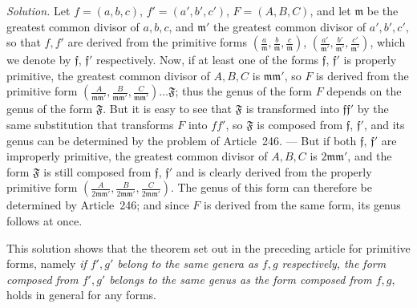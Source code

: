 \textit{Solution.} Let $f=(a,b,c)$, $f'=(a',b',c')$, $F=(A,B,C)$, and let $\mathfrak{m}$ be the greatest common divisor of $a,b,c$, and $\mathfrak{m}'$ the greatest common divisor of $a',b',c'$, so that $f,f'$ are derived from the primitive forms $(\frac{a}{\mathfrak{m}},\allowbreak \frac{b}{\mathfrak{m}},\allowbreak \frac{c}{\mathfrak{m}})$, $(\frac{a'}{\mathfrak{m}'},\allowbreak \frac{b'}{\mathfrak{m}'},\allowbreak \frac{c'}{\mathfrak{m}'})$, which we denote by $\mathfrak{f}$, $\mathfrak{f}'$ respectively. Now, if at least one of the forms $\mathfrak{f}$, $\mathfrak{f}'$ is properly primitive, the greatest common divisor of $A,B,C$ is $\mathfrak{m}\mathfrak{m}'$, so $F$ is derived from the primitive form $(\frac{A}{\mathfrak{m}\mathfrak{m}'},\allowbreak \frac{B}{\mathfrak{m}\mathfrak{m}'},\allowbreak \frac{C}{\mathfrak{m}\mathfrak{m}'})\ldots\mathfrak{F}$; thus the genus of the form $F$ depends on the genus of the form $\mathfrak{F}$. But it is easy to see that $\mathfrak{F}$ is transformed into $\mathfrak{f}\mathfrak{f}'$ by the same substitution that transforms $F$ into $ff'$, so $\mathfrak{F}$ is composed from $\mathfrak{f}$, $\mathfrak{f}'$, and its genus can be determined by the problem of Article~246. --- But if both $\mathfrak{f}$, $\mathfrak{f}'$ are improperly primitive, the greatest common divisor of $A,B,C$ is $2\mathfrak{m}\mathfrak{m}'$, and the form $\mathfrak{F}$ is still composed from $\mathfrak{f}$, $\mathfrak{f}'$ and is clearly derived from the properly primitive form $(\frac{A}{2\mathfrak{m}\mathfrak{m}'},\allowbreak \frac{B}{2\mathfrak{m}\mathfrak{m}'},\allowbreak \frac{C}{2\mathfrak{m}\mathfrak{m}'})$. The genus of this form can therefore be determined by Article~246; and since $F$ is derived from the same form, its genus follows at once.

This solution shows that the theorem set out in the preceding article for primitive forms, namely \textit{if $f',g'$ belong to the same genera as $f,g$ respectively, the form composed from $f',g'$ belongs to the same genus as the form composed from $f,g$}, holds in general for any forms.
